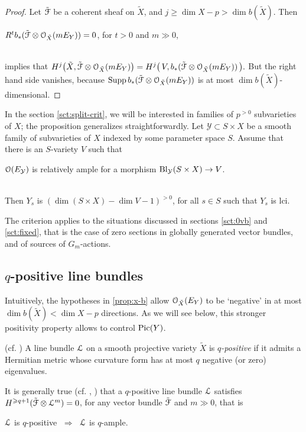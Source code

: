 \documentclass[11pt,reqno]{amsart}
\newenvironment{m-remark}{\vskip5pt\refstepcounter{stff}\trivlist \itemindent 0pt
\item[\hskip\labelsep\bf Remark~\thestff]\ignorespaces}{\endtrivlist\vskip5pt}
\let\euf\EuScript
\let\cal\mathcal
\let\tld\tilde
\numberwithin{equation}{section}
\numberwithin{figure}{section}
\let\ges\geqslant
\begin{document}
\begin{proof}
Let $\tld{{\euf F}}$ be a coherent sheaf on $\tld X$, and $j\ges\dim X-p>\dim b(\tld X)$. Then 
\\[.5ex] \centerline{
$R^tb_*(\tld{{\euf F}}\otimes{{\euf O}}_{\tld X}(mE_Y))=0$, for $t>0$ and $m\gg0$,
}\\[.5ex] 
implies that 
$H^{j}\big(\tld X,\tld{{\euf F}}\otimes{{\euf O}}_{\tld X}(mE_Y)\big)=
H^j\big(\,V,b_*(\tld{{\euf F}}\otimes{{\euf O}}_{\tld X}(mE_Y))\,\big).$ 
But the right hand side vanishes, because ${{\rm Supp}\,} b_*(\tld{{\euf F}}\otimes{{\euf O}}_{\tld X}(mE_Y))$ 
is at most $\dim b(\tld X)$-dimensional. 
\end{proof}

\begin{m-remark}\label{rmk:x-b}
In the section \ref{sct:split-crit}, we will be interested in families of $p^{{>0}}$ 
subvarieties of $X$; the proposition generalizes straightforwardly. 
Let ${{\cal Y}}\subset S\times X$ be a smooth family of subvarieties of $X$ indexed by 
some parameter space $S$. Assume that there is an $S$-variety $V$ such that  
\\[1ex]\centerline{
${{\euf O}}(E_{{\cal Y}})$ is relatively ample for a morphism ${{\rm Bl}}_{{\cal Y}}(S\times X)\to V$. 
}\\[1ex]
Then $Y_s$ is $(\dim (S\times X)-\dim V-1)^{{>0}}$, for all $s\in S$ such that $Y_s$ is lci.
\end{m-remark}

The criterion applies to the situations discussed in sections \ref{sct:0vb} and 
\ref{sct:fixed}, that is the case of zero sections in globally generated vector bundles, 
and of sources of $G_m$-actions. 

\subsection{$q$-positive line bundles}\label{ssct:q-line-bdl}

Intuitively, the hypotheses in \ref{prop:x-b} allow ${{\euf O}}_{\tld X}(E_Y)$ to be `negative' 
in at most $\dim b(\tld X)<\dim X-p$ directions. 
As we will see below, this stronger positivity property allows to control ${\mathop{\rm Pic}\nolimits}(Y)$. 

\begin{m-definition}\label{def:p-line-bdl}{(cf. \cite{dps})} 
A line bundle ${{\euf L}}$ on a smooth projective variety $\tld X$ is \emph{$q$-positive} 
if it admits a Hermitian metric whose curvature form has at most $q$ negative (or zero) 
eigenvalues. 
\end{m-definition}
It is generally true (cf. \cite[Proposition 28]{ag}, \cite[Proposition 2.1]{dps}) 
that a $q$-positive line bundle ${{\euf L}}$ satisfies $H^{\ges q+1}(\tld{{\euf F}}\otimes{{\euf L}}^m)=0$, 
for any vector bundle $\tld{{\euf F}}$ and $m\gg0$, that is 
\\[1ex] \centerline{
${{\euf L}}$ is $q$-positive
$\;\Rightarrow\;$ 
${{\euf L}}$ is $q$-ample. 
}
\end{document}

